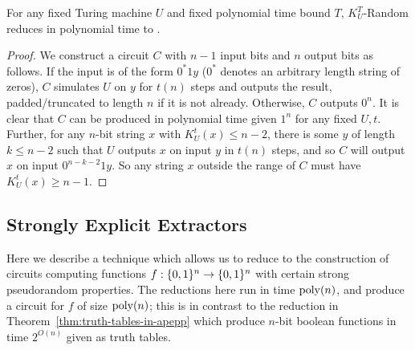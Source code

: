 \begin{theorem}\label{thm:kt-random}
For any fixed Turing machine $U$ and fixed polynomial time bound $T$, {\sc $K_U^T$-Random} reduces in polynomial time to \avoid.
\end{theorem}
\begin{proof}
We construct a circuit $C$ with $n-1$ input bits and $n$ output bits as follows. If the input is of the form $0^*1y$ ($0^*$ denotes an arbitrary length string of zeros), $C$ simulates $U$ on $y$ for $t(n)$ steps and outputs the result, padded/truncated to length $n$ if it is not already. Otherwise, $C$ outputs $0^n$. It is clear that $C$ can be produced in polynomial time given $1^n$ for any fixed $U,t$. Further, for any $n$-bit string $x$ with $K_U^t(x) \leq n - 2$, there is some $y$ of length $k \leq n-2$ such that $U$ outputs $x$ on input $y$ in $t(n)$ steps, and so $C$ will output $x$ on input $0^{n-k-2}1y$. So any string $x$ outside the range of $C$ must have $K_U^t(x) \geq n - 1$.
\end{proof} 
\subsection{Strongly Explicit Extractors}\label{range:subsec:strongly-explicit-extractors}
Here we describe a technique which allows us to reduce to \avoid the construction of circuits computing functions $f: \{0,1\}^n \to \{0,1\}^n$ with certain strong pseudorandom properties. The reductions here run in time $\mathrm{poly}(n)$, and produce a circuit for $f$ of size $\mathrm{poly}(n)$; this is in contrast to the reduction in Theorem~\ref{thm:truth-tables-in-apepp} which produce $n$-bit boolean functions in time $2^{O(n)}$ given as truth tables.

